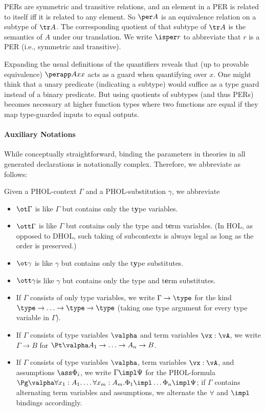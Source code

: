 PERs are symmetric and transitive relations, and an element in a PER is related to itself iff it is related to any element.
So $\per A$ is an equivalence relation on a subtype of $\tr A$.
The corresponding quotient of that subtype of $\tr A$ is the semantics of $A$ under our translation.
We write $\isper r$ to abbreviate that $r$ is a PER (i.e., symmetric and transitive).

Expanding the usual definitions of the quantifiers reveals that (up to provable equivalence)
$\perapp Axx$ acts as a guard when quantifying over $x$. 
One might think that a unary predicate (indicating a subtype) would suffice as a type guard instead of a binary predicate.
But using quotients of subtypes (and thus PERs) becomes necessary at higher function types where two functions are equal if they map type-guarded inputs to equal outputs.

\paragraph*{Auxiliary Notations}
While conceptually straightforward, binding the parameters in theories in all generated
declarations is notationally complex. Therefore, we abbreviate as follows:

\begin{definition}\label{def:holabbrs}
Given a PHOL-context $\Gamma$ and a PHOL-substitution \(\gamma\), we abbreviate
\begin{itemize}
\item $\ot\Gamma$ is like $\Gamma$ but contains only the t\textbf{y}pe variables.
\item $\ott\Gamma$ is like $\Gamma$ but contains only the type and t\textbf{e}rm variables. (In HOL, as opposed to DHOL, such taking of subcontexts is always legal as long as the order is preserved.)
\item $\ot\gamma$ is like $\gamma$ but contains only the t\textbf{y}pe substitutes.
\item $\ott\gamma$is like $\gamma$ but contains only the type and t\textbf{e}rm substitutes.
\item If $\Gamma$ consists of only type variables, we write $\Gamma\to\type$ for the kind $\type\to\ldots\to\type\to\type$ (taking one type argument for every type variable in $\Gamma$).
\item If $\Gamma$ consists of type variables $\valpha$ and term variables $\vx:\vA$, we write $\Gamma\to B$ for $\Pt\valpha A_1\to\ldots\to A_n\to B$.
\item If $\Gamma$ consists of type variables $\valpha$, term variables $\vx:\vA$, and assumptions
  $\ass \Phi_i$, we write $\Gamma\impl \Psi$ for the PHOL-formula $\Pg\valpha \forall
  x_1:A_1.\ldots\forall x_m:A_m.\Phi_1\impl \ldots \Phi_n\impl \Psi$; if $\Gamma$ contains alternating term variables and assumptions, we alternate the $\forall$ and $\impl$ bindings accordingly.
\end{itemize}
\end{definition}

